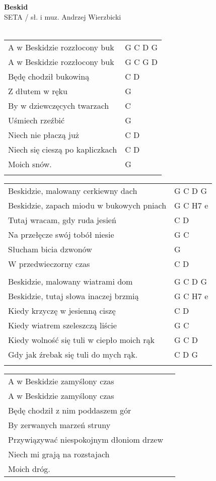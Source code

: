 \documentclass[a5paper]{article}
\begin{document}


\noindent
\fontsize{12pt}{15pt}\selectfont
\textbf{Beskid} \\
\fontsize{8pt}{10pt}\selectfont
SETA / sł. i muz. Andrzej Wierzbicki \\ \\
\fontsize{10pt}{12pt}\selectfont
{}
\begin{tabular}{@{}p{8.5cm}p{3cm}@{}}
\noindent
A w Beskidzie rozzłocony buk & G C D G \\
A w Beskidzie rozzłocony buk & G C G D \\
Będę chodził bukowiną & C D \\
Z dłutem w ręku & G \\
By w dziewczęcych twarzach & C \\
Uśmiech rzeźbić & G \\
Niech nie płaczą już & C D \\
Niech się cieszą po kapliczkach & C D \\
Moich snów. & G \\ \\
\end{tabular}

\noindent
\begin{tabular}{@{}p{7.5cm}p{3cm}@{}}
Beskidzie, malowany cerkiewny dach & G C D G \\
Beskidzie, zapach miodu w bukowych pniach & G C H7 e \\
Tutaj wracam, gdy ruda jesień & C D \\
Na przełęcze swój tobół niesie & G C \\
Słucham bicia dzwonów & G \\
W przedwieczorny czas & C D \\ \\
Beskidzie, malowany wiatrami dom & G C D G \\
Beskidzie, tutaj słowa inaczej brzmią & G C H7 e \\
Kiedy krzyczę w jesienną ciszę & C D \\
Kiedy wiatrem szeleszczą liście & G C \\
Kiedy wolność się tuli w ciepło moich rąk & G C D \\
Gdy jak źrebak się tuli do mych rąk. & C D G \\ \\
\end{tabular}

\noindent
\begin{tabular}{@{}p{8.5cm}p{3cm}@{}}
A w Beskidzie zamyślony czas\\
A w Beskidzie zamyślony czas\\
Będę chodził z nim poddaszem gór\\
By zerwanych marzeń struny\\
Przywiązywać niespokojnym dłoniom drzew\\
Niech mi grają na rozstajach\\
Moich dróg.
\end{tabular}
\end{document}
